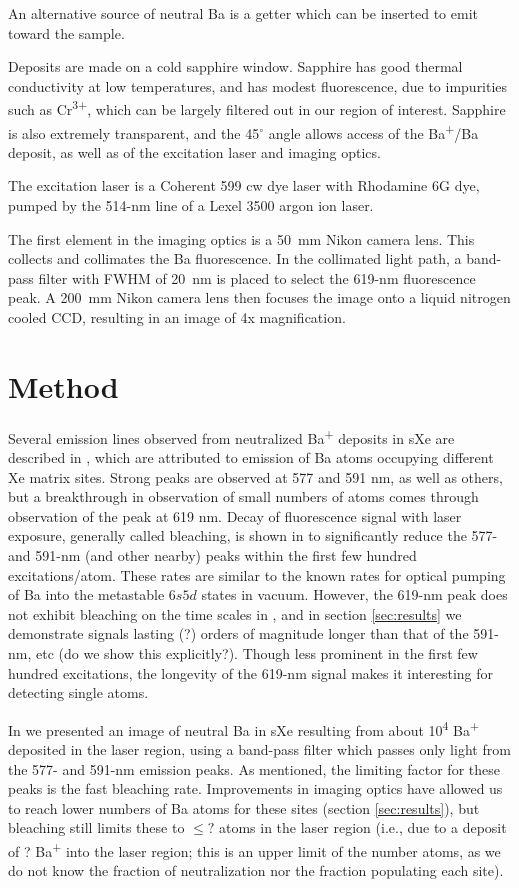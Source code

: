 \documentclass[aps,pra,reprint,superscriptaddress]{revtex4-1}
\begin{document}
An alternative source of neutral Ba is a getter which can be inserted to emit toward the sample.

Deposits are made on a cold sapphire window.  Sapphire has good thermal conductivity at low temperatures, and has modest fluorescence, due to impurities such as Cr\textsuperscript{3+}, which can be largely filtered out in our region of interest.  Sapphire is also extremely transparent, and the 45$^{\circ}$ angle allows access of the Ba\textsuperscript{+}/Ba deposit, as well as of the excitation laser and imaging optics.  

The excitation laser is a Coherent 599 cw dye laser with Rhodamine 6G dye, pumped by the 514-nm line of a Lexel 3500 argon ion laser.  

The first element in the imaging optics is a 50~mm Nikon camera lens.  This collects and collimates the Ba fluorescence.  In the collimated light path, a band-pass filter with FWHM of 20~nm is placed to select the 619-nm fluorescence peak.  A 200~mm Nikon camera lens then focuses the image onto a liquid nitrogen cooled CCD, resulting in an image of 4x magnification.

\section{Method}

Several emission lines observed from neutralized Ba\textsuperscript{+} deposits in sXe are described in \cite{Mong2015}, which are attributed to emission of Ba atoms occupying different Xe matrix sites.  Strong peaks are observed at 577 and 591 nm, as well as others, but a breakthrough in observation of small numbers of atoms comes through observation of the peak at 619 nm.  Decay of fluorescence signal with laser exposure, generally called bleaching, is shown in \cite{Mong2015} to significantly reduce the 577- and 591-nm (and other nearby) peaks within the first few hundred excitations/atom.  These rates are similar to the known rates for optical pumping of Ba into the metastable $6s5d$ states in vacuum.  However, the 619-nm peak does not exhibit bleaching on the time scales in \cite{Mong2015}, and in section \ref{sec:results} we demonstrate signals lasting (?) orders of magnitude longer than that of the 591-nm, etc {\color{red}(do we show this explicitly?)}.  Though less prominent in the first few hundred excitations, the longevity of the 619-nm signal makes it interesting for detecting single atoms.

In \cite{Mong2015} we presented an image of neutral Ba in sXe resulting from about 10\textsuperscript{4} Ba\textsuperscript{+} deposited in the laser region, using a band-pass filter which passes only light from the 577- and 591-nm emission peaks.  As mentioned, the limiting factor for these peaks is the fast bleaching rate.  {\color{blue}Improvements in imaging optics have allowed us to reach lower numbers of Ba atoms for these sites (section \ref{sec:results}), but bleaching still limits these to $\leq?$ atoms in the laser region (i.e., due to a deposit of ? Ba\textsuperscript{+} into the laser region; this is an upper limit of the number atoms, as we do not know the fraction of neutralization nor the fraction populating each site).}
\end{document}

